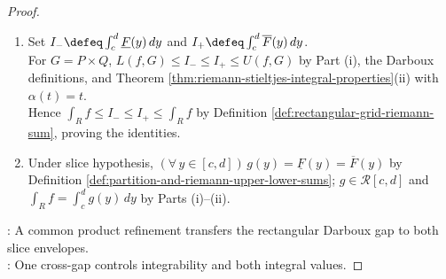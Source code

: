 \begin{theorem}
\begin{proof}
\begin{enumerate}[label=(\roman*)]
Set $P_\ast\defeq P_L\cup P_U$, $Q_\ast\defeq Q_L\cup Q_U$, and $G_\ast\defeq P_\ast\times Q_\ast$. Then $U(f,G_\ast)-L(f,G_\ast)<\varepsilon$ by cellwise refinement monotonicity.\\
Set $D_-\defeq U(Q_\ast,\underline F)-L(Q_\ast,\underline F)$ and $D_+\defeq U(Q_\ast,\overline F)-L(Q_\ast,\overline F)$. Then $0\leq\max\{D_-,D_+\}\leq U(Q_\ast,\overline F)-L(Q_\ast,\underline F)<\varepsilon$ because $\underline F\leq\overline F$.\\
Thus $\underline F,\overline F\in\mathcal R[c,d]$ by Theorem \ref{thm:riemann-stieltjes-integrability-criterion} with $\alpha(t)=t$.
\item Set $I_-\defeq\int_c^d\underline F(y)\,dy$ and $I_+\defeq\int_c^d\overline F(y)\,dy$.\\
For $G=P\times Q$, $L(f,G)\leq I_-\leq I_+\leq U(f,G)$ by Part (i), the Darboux definitions, and Theorem \ref{thm:riemann-stieltjes-integral-properties}(ii) with $\alpha(t)=t$.\\
Hence $\int_R f\leq I_-\leq I_+\leq\int_R f$ by Definition \ref{def:rectangular-grid-riemann-sum}, proving the identities.
\item Under slice hypothesis, $(\forall\,y\in[c,d])\,g(y)=\underline F(y)=\overline F(y)$ by Definition \ref{def:partition-and-riemann-upper-lower-sums}; $g\in\mathcal R[c,d]$ and $\int_R f=\int_c^d g(y)\,dy$ by Parts (i)--(ii).
\end{enumerate}
: A common product refinement transfers the rectangular Darboux gap to both slice envelopes.\\
: One cross-gap controls integrability and both integral values.
\end{proof}
\end{theorem}

